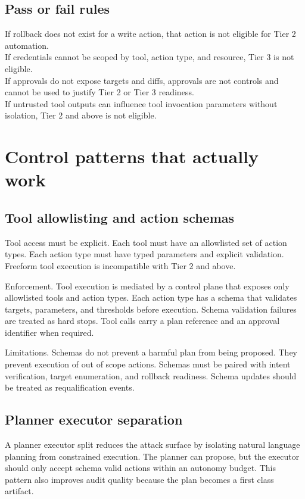 \documentclass[11pt]{article}
\begin{document}
\subsection{Pass or fail rules}
If rollback does not exist for a write action, that action is not eligible for Tier 2 automation.\\
If credentials cannot be scoped by tool, action type, and resource, Tier 3 is not eligible.\\
If approvals do not expose targets and diffs, approvals are not controls and cannot be used to justify Tier 2 or Tier 3 readiness.\\
If untrusted tool outputs can influence tool invocation parameters without isolation, Tier 2 and above is not eligible.

\section{Control patterns that actually work}

\subsection{Tool allowlisting and action schemas}
Tool access must be explicit. Each tool must have an allowlisted set of action types. Each action type must have typed parameters and explicit validation. Freeform tool execution is incompatible with Tier 2 and above.

Enforcement. Tool execution is mediated by a control plane that exposes only allowlisted tools and action types. Each action type has a schema that validates targets, parameters, and thresholds before execution. Schema validation failures are treated as hard stops. Tool calls carry a plan reference and an approval identifier when required.

Limitations. Schemas do not prevent a harmful plan from being proposed. They prevent execution of out of scope actions. Schemas must be paired with intent verification, target enumeration, and rollback readiness. Schema updates should be treated as requalification events.

\subsection{Planner executor separation}
A planner executor split reduces the attack surface by isolating natural language planning from constrained execution. The planner can propose, but the executor should only accept schema valid actions within an autonomy budget. This pattern also improves audit quality because the plan becomes a first class artifact.
\end{document}
